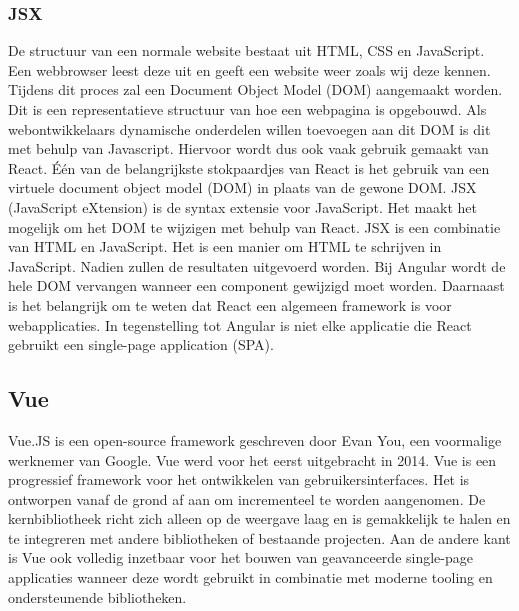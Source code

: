 \subsubsection*{JSX}
De structuur van een normale website bestaat uit HTML, CSS en JavaScript. Een
webbrowser leest deze uit en geeft een website weer zoals wij deze kennen.
Tijdens dit proces zal een Document Object Model (DOM) aangemaakt worden. Dit is
een representatieve structuur van hoe een webpagina is opgebouwd. Als
webontwikkelaars dynamische onderdelen willen toevoegen aan dit DOM is dit met behulp van
Javascript. Hiervoor wordt dus ook vaak gebruik gemaakt van React. Één van de belangrijkste stokpaardjes van React is het gebruik van een virtuele document object model (DOM) in plaats van de gewone DOM. JSX (JavaScript eXtension) is de syntax extensie voor JavaScript. Het maakt het mogelijk om het DOM te wijzigen met behulp van React. JSX is een combinatie van HTML en JavaScript. Het is een manier om HTML te schrijven in JavaScript. Nadien zullen de resultaten uitgevoerd worden. Bij Angular wordt de hele DOM vervangen wanneer een component gewijzigd moet worden. Daarnaast is het belangrijk om te weten dat React een algemeen framework is voor webapplicaties. In tegenstelling tot Angular is niet elke applicatie die React gebruikt een single-page application (SPA).

\subsection*{Vue}%
Vue.JS is een open-source framework geschreven door Evan You, een voormalige
werknemer van Google. Vue werd voor het eerst uitgebracht in 2014. Vue is een
progressief framework voor het ontwikkelen van gebruikersinterfaces. Het is
ontworpen vanaf de grond af aan om incrementeel te worden aangenomen. De
kernbibliotheek richt zich alleen op de weergave laag en is gemakkelijk te
halen en te integreren met andere bibliotheken of bestaande projecten. Aan de
andere kant is Vue ook volledig inzetbaar voor het bouwen van geavanceerde
single-page applicaties wanneer deze wordt gebruikt in combinatie met moderne
tooling en ondersteunende bibliotheken.\autocite{VueGithub2024}

